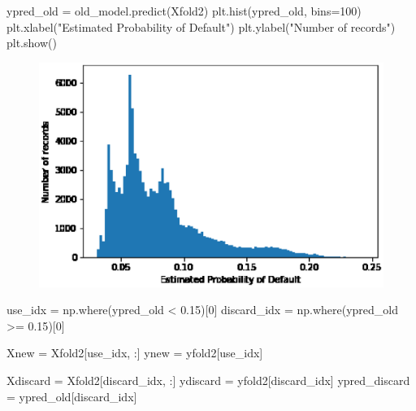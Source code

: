\documentclass[11pt]{jsarticle}
\newenvironment{Shaded}{}{}
\newcommand{\DecValTok}[1]{\textcolor[rgb]{0.25,0.63,0.44}{{#1}}}
\newcommand{\FloatTok}[1]{\textcolor[rgb]{0.25,0.63,0.44}{{#1}}}
\newcommand{\StringTok}[1]{\textcolor[rgb]{0.25,0.44,0.63}{{#1}}}
\newcommand{\NormalTok}[1]{{#1}}
\newcommand{\OperatorTok}[1]{\textcolor[rgb]{0.40,0.40,0.40}{{#1}}}
\begin{document}
    \begin{Shaded}
\begin{Highlighting}[]
\NormalTok{ypred_old }\OperatorTok{=}\NormalTok{ old_model.predict(Xfold2)}
\NormalTok{plt.hist(ypred_old, bins}\OperatorTok{=}\DecValTok{100}\NormalTok{)}
\NormalTok{plt.xlabel(}\StringTok{"Estimated Probability of Default"}\NormalTok{)}
\NormalTok{plt.ylabel(}\StringTok{"Number of records"}\NormalTok{)}
\NormalTok{plt.show()}
\end{Highlighting}
\end{Shaded}
\begin{figure}[htbp]
  \begin{center}
    \includegraphics[clip, scale=0.80]{./hist.eps}
  \end{center}
\end{figure}
    \begin{Shaded}
\begin{Highlighting}[]
\NormalTok{use_idx }\OperatorTok{=}\NormalTok{ np.where(ypred_old }\OperatorTok{<} \FloatTok{0.15}\NormalTok{)[}\DecValTok{0}\NormalTok{]}
\NormalTok{discard_idx }\OperatorTok{=}\NormalTok{ np.where(ypred_old }\OperatorTok{>=} \FloatTok{0.15}\NormalTok{)[}\DecValTok{0}\NormalTok{]}

\NormalTok{Xnew }\OperatorTok{=}\NormalTok{ Xfold2[use_idx, :]}
\NormalTok{ynew }\OperatorTok{=}\NormalTok{ yfold2[use_idx]}

\NormalTok{Xdiscard }\OperatorTok{=}\NormalTok{ Xfold2[discard_idx, :]}
\NormalTok{ydiscard }\OperatorTok{=}\NormalTok{ yfold2[discard_idx]}
\NormalTok{ypred_discard }\OperatorTok{=}\NormalTok{ ypred_old[discard_idx]}
\end{Highlighting}
\end{Shaded}
\end{document}
